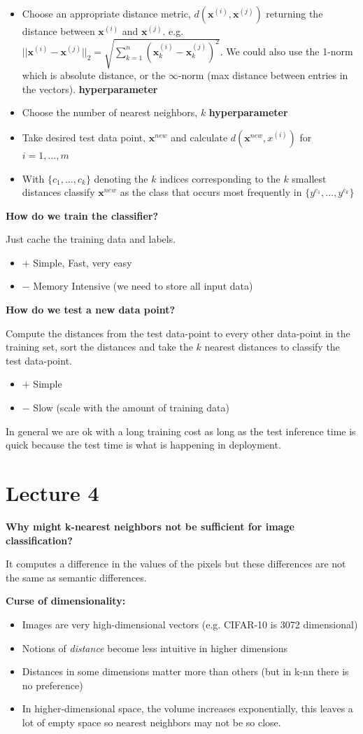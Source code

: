 \documentclass[twocolumn, letter, 10pt, landscape]{article}
\newcommand{\mb}{\mathbf}
\newcommand{\tb}{\textbf}
\newcommand{\ti}{\textit}
\newcommand{\bit}{\vspace{-0.1in}\begin{itemize}\setlength\itemsep{-0.05in}}
\newcommand{\eit}{\end{itemize}\vspace{-0.1in}}
\begin{document}
\bit{}
\item Choose an appropriate distance metric, $d(\mb{x}^{(i)}, \mb{x}^{(j)})$ returning the distance between $\mb{x}^{(i)}$ and $\mb{x}^{(j)}$. e.g. $||\mb{x}^{(i)} - \mb{x}^{(j)}||_2 = \sqrt{\sum_{k=1}^{n}(\mb{x}_k^{(i)} - \mb{x}_k^{(j)})^2}$. We could also use the 1-norm which is absolute distance, or the $\infty$-norm (max distance between entries in the vectors). \tb{hyperparameter}
\item Choose the number of nearest neighbors, $k$ \tb{hyperparameter}
\item Take desired test data point, $\mb{x}^{new}$ and calculate $d(\mb{x}^{new}, x^{(i)})$ for $i=1,...,m$
\item With $\{c_1,...,c_k\}$ denoting the $k$ indices corresponding to the $k$ smallest distances classify $\mb{x}^{new}$ as the class that occurs most frequently in $\{y^{c_1},...,y^{c_k}\}$
\eit{}

\tb{How do we train the classifier?}

Just cache the training data and labels.
\bit{}
\item[$+$] Simple, Fast, very easy
\item[$-$] Memory Intensive (we need to store all input data)
\eit{}

\tb{How do we test a new data point?}

Compute the distances from the test data-point to every other data-point in the training set, sort the distances and take the $k$ nearest distances to classify the test data-point.
\bit{}
\item[$+$] Simple
\item[$-$] Slow (scale with the amount of training data)
\eit{}
In general we are ok with a long training cost as long as the test inference time is quick because the test time is what is happening in deployment.

\section{Lecture 4}
\textbf{Why might k-nearest neighbors not be sufficient for image classification?}

It computes a difference in the values of the pixels but these differences are not the same as semantic differences. 

\textbf{Curse of dimensionality:}
\bit{}
\item Images are very high-dimensional vectors (e.g. CIFAR-10 is 3072 dimensional)
\item Notions of \ti{distance} become less intuitive in higher dimensions
\item Distances in some dimensions matter more than others (but in k-nn there is no preference)
\item In higher-dimensional space, the volume increases exponentially, this leaves a lot of empty space so nearest neighbors may not be so close.
\eit{}
\end{document}
